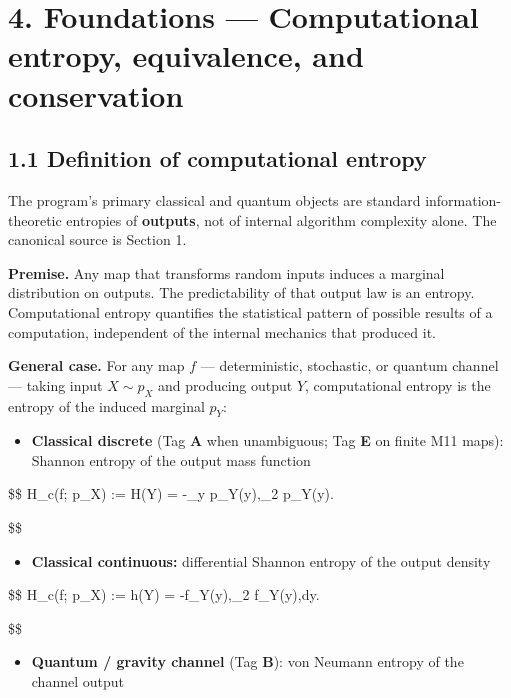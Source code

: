 \documentclass[
  11pt,
]{article}
\providecommand{\tightlist}{%
  \setlength{\itemsep}{0pt}\setlength{\parskip}{0pt}}
\begin{document}
\section{4. Foundations --- Computational entropy, equivalence, and conservation}\label{foundations-computational-entropy-equivalence-and-conservation}

\subsection{1.1 Definition of computational entropy}\label{definition-of-computational-entropy}

The program's primary classical and quantum objects are standard information-theoretic entropies of \textbf{outputs}, not of internal algorithm complexity alone. The canonical source is Section 1.

\textbf{Premise.} Any map that transforms random inputs induces a marginal distribution on outputs. The predictability of that output law is an entropy. Computational entropy quantifies the statistical pattern of possible results of a computation, independent of the internal mechanics that produced it.

\textbf{General case.} For any map \(f\) --- deterministic, stochastic, or quantum channel --- taking input \(X\sim p_X\) and producing output \(Y\), computational entropy is the entropy of the induced marginal \(p_Y\):

\begin{itemize}
\tightlist
\item
  \textbf{Classical discrete} (Tag \textbf{A} when unambiguous; Tag \textbf{E} on finite M11 maps): Shannon entropy of the output mass function
\end{itemize}

\$\$ H\_c(f; p\_X) := H(Y) = -\sum\_y p\_Y(y),\log\_2 p\_Y(y).

\$\$

\begin{itemize}
\tightlist
\item
  \textbf{Classical continuous:} differential Shannon entropy of the output density
\end{itemize}

\$\$ H\_c(f; p\_X) := h(Y) = -\int f\_Y(y),\log\_2 f\_Y(y),dy.

\$\$

\begin{itemize}
\tightlist
\item
  \textbf{Quantum / gravity channel} (Tag \textbf{B}): von Neumann entropy of the channel output
\end{itemize}
\end{document}
